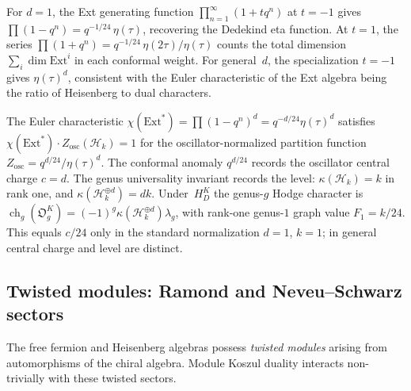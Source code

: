 \begin{remark}
\label{rem:fock-ext-jacobi}
For $d = 1$, the Ext generating function
$\prod_{n=1}^\infty (1 + tq^n)$ at $t = -1$ gives
$\prod(1 - q^n) = q^{-1/24}\,\eta(\tau)$, recovering the
Dedekind eta function. At $t = 1$, the series
$\prod(1 + q^n) = q^{-1/24}\,\eta(2\tau)/\eta(\tau)$
counts the total dimension $\sum_i \dim \mathrm{Ext}^i$
in each conformal weight. For general~$d$, the specialization
$t = -1$ gives $\eta(\tau)^d$, consistent with the Euler
characteristic of the Ext algebra being the ratio of Heisenberg
to dual characters.
\end{remark}

\begin{remark}
\label{rem:ext-genus-universality}
The Euler characteristic
$\chi(\mathrm{Ext}^*)=\prod(1-q^n)^d=q^{-d/24}\eta(\tau)^d$
satisfies
$\chi(\mathrm{Ext}^*)\cdot Z_{\mathrm{osc}}(\mathcal{H}_k)=1$ for
the oscillator-normalized partition function
$Z_{\mathrm{osc}}=q^{d/24}/\eta(\tau)^d$. The conformal anomaly
$q^{d/24}$ records the oscillator central charge $c=d$. The genus
universality invariant records the level:
$\kappa(\mathcal{H}_k)=k$ in rank one, and
$\kappa(\mathcal{H}_k^{\oplus d})=dk$. Under~$H_D^K$ the genus-$g$
Hodge character is
$\operatorname{ch}_g(\mathfrak O_g^K)=
(-1)^g\kappa(\mathcal{H}_k^{\oplus d})\lambda_g$, with rank-one
genus-$1$ graph value
$F_1=k/24$. This equals $c/24$ only in the standard normalization
$d=1$, $k=1$; in general central charge and level are distinct.
\end{remark}


\subsection{Twisted modules: Ramond and Neveu--Schwarz sectors}
\label{sec:twisted-modules-free-fields}

The free fermion and Heisenberg algebras possess \emph{twisted modules}
arising from automorphisms of the chiral algebra. Module Koszul duality
interacts non-trivially with these twisted sectors.

